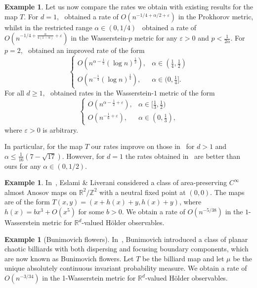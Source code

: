 \documentclass[11pt,a4paper,reqno,oneside]{amsart}
\newcommand{\Z}{\ensuremath{\mathbb{Z}}}%
\newcommand{\R}{\ensuremath{\mathbb{R}}}%
\newcommand{\eps}{\varepsilon}
\theoremstyle{definition}
\newtheorem{example}[theorem]{Example}
\theoremstyle{remark}
\numberwithin{equation}{section}
\begin{document}
\begin{example}
Let us now compare the rates we obtain with existing results for the map $T$. For $d=1$,~\cite{antoniou_melbourne} obtained a rate of $O(n^{-1/4+\alpha/2+\eps})$ in the Prokhorov metric, whilst in the restricted range $\alpha\in (0,1/4)$~\cite{liu_wang_stationary} obtained a rate of $O(n^{-1/4+\frac{\alpha}{4(1-\alpha)}+\eps})$ in the Wasserstein-$p$ metric for any $\eps>0$ and $p<\frac{1}{2\alpha}$. For $p=2$,~\cite{dedecker_merlevede_rio} obtained an improved rate of the form
\[ \begin{cases} %
	O(n^{\alpha-\frac12}(\log n)^{\frac{1}{2}}), & \alpha \in (\frac{1}{4},\frac{1}{2})\\
	O(n^{-\frac14}(\log n)^{\frac{1}{4}}), & \alpha \in (0,\frac{1}{4}].
\end{cases} \]
For all $d\ge 1$,~\cite{paviato_rates_article} obtained rates in the Wasserstein-$1$ metric of the form 
\[ \begin{cases}
	O(n^{\alpha - \frac12 + \eps}), & \alpha \in [\frac{1}{3},\frac{1}{2}) \\
	O(n^{-\frac{1}{6}+\eps}), & \alpha \in (0,\frac{1}{3}),
\end{cases}\]
where $\eps>0$ is arbitrary.

In particular, for the map $T$ our rates improve on those in~\cite{paviato_rates_article} for $d>1$ and $\alpha \le \frac{1}{16}(7-\sqrt{17})$. However, for $d=1$ the rates obtained in~\cite{dedecker_merlevede_rio} are better than ours for any $\alpha\in (0,1/2)$.
\end{example}
\begin{example}\label{exa:eslami_liverani}
    In~\cite{eslami_liverani}, Eslami \& Liverani considered a class of area-preserving $C^\infty$ almost Anosov maps on $\R^2/\Z^2$ with a neutral fixed point at $(0,0)$. The maps are of the form 
$T(x,y) = (x+h(x)+y,h(x)+y)$, where $h(x) = bx^3 + O(x^5)$ for some $b>0$. We obtain a rate of $O(n^{-5/38})$ in the $1$-Wasserstein metric for $\R^d$-valued H\"older observables.
\end{example}
\begin{example}[Bunimovich flowers]\label{exa:flowers}
	In~\cite{bunimovich_flowers}, Bunimovich introduced a class of planar chaotic billiards with both dispersing and focusing boundary components, which are now known as Bunimovich flowers. Let $T$ be the billiard map and let $\mu$ be the unique absolutely continuous invariant probability measure. We obtain a rate of $O(n^{-3/34})$ in the 1-Wasserstein metric for $\R^d$-valued H\"older observables.
\end{example}
\end{document}
